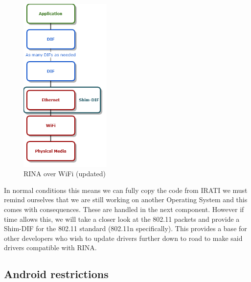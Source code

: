 \begin{figure}[H]
    \centering
    \includegraphics[width=0.4\textwidth]{figures/rinaoverwifi2}
    \caption{RINA over WiFi (updated)} 
    \label{fig:rinaoverwifi2}
\end{figure}

\npar
In normal conditions this means we can fully copy the code from IRATI we must remind ourselves that we are still working on another Operating System and this comes with consequences. These are handled in the next component. However if time allows this, we will take a closer look at the 802.11 packets and provide a Shim-DIF for the 802.11 standard (802.11n specifically). This provides a base for other developers who wish to update drivers further down to road to make said drivers compatible with RINA. 

\subsection{Android restrictions}

